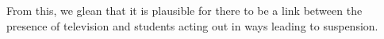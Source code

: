 \documentclass{article}
\begin{document}

\clearpage

From this, we glean that it is plausible for there to be a link between the presence of television and students acting out in ways leading to suspension. 

%

%
\end{document}
